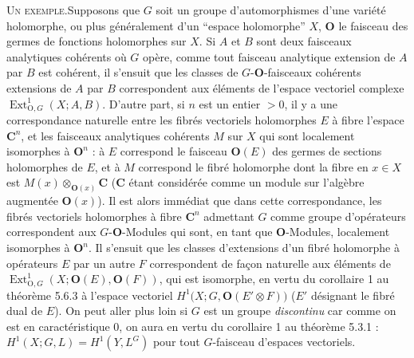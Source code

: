 \clearpage
{}

\textsc{Un exemple.}\quad Supposons que $G$ soit un groupe
d'automorphismes d'une variété holomorphe, ou plus généralement d'un
``espace holomorphe'' $X$, ${\mathbf O}$ le faisceau des germes de fonctions
holomorphes sur $X$.
Si $A$ et $B$ sont deux faisceaux analytiques cohérents où $G$ opère, comme
tout faisceau analytique extension de $A$ par $B$ est cohérent, il s'ensuit
que les classes de $G$-${\mathbf O}$-faisceaux cohérents extensions de $A$ par $B$
correspondent aux éléments de l'espace vectoriel complexe
$\operatorname{Ext}_{{\mathrm O},G}^{1}(X;A,B)$.
D'autre part, si $n$ est un entier $>0$, il y a une correspondance naturelle
entre les fibrés vectoriels holomorphes $E$ à fibre l'espace $\mathbf C^n$, et
les faisceaux analytiques cohérents $M$ sur $X$ qui sont localement isomorphes
à ${\mathbf O}^n$ : à $E$ correspond le faisceau ${\mathbf O}(E)$ des germes de sections
holomorphes de $E$, et à $M$ correspond le fibré holomorphe dont la fibre en
$x\in X$ est $M(x)\otimes_{{\mathbf O}(x)}\mathbf C$ ($\mathbf C$ étant considérée comme
un module sur l'algèbre augmentée ${\mathbf O}(x)$).
Il est alors immédiat que dans cette correspondance, les fibrés vectoriels
holomorphes à fibre $\mathbf C^n$ admettant $G$ comme groupe d'opérateurs
correspondent aux $G$-${\mathbf O}$-Modules qui sont, en tant que ${\mathbf O}$-Modules,
localement isomorphes à ${\mathbf O}^n$.
Il s'ensuit que les classes d'extensions d'un fibré holomorphe à opérateurs
$E$ par un autre $F$ correspondent de façon naturelle aux éléments de
$\operatorname{Ext}_{{\mathrm O},G}^{1}(X;{\mathbf O}(E),{\mathbf O}(F))$, qui est isomorphe, en vertu du
corollaire 1 au théorème 5.6.3 à l'espace vectoriel
$H^1\bigl(X;G,{\mathbf O}(E'\otimes F)\bigr)$
($E'$ désignant le fibré dual de $E$).
On peut aller plus loin si $G$ est un groupe \textit{discontinu} car comme on
est en caractéristique 0, on aura en vertu du corollaire 1 au théorème 5.3.1 :
$H^1(X;G,L)=H^1(Y,L^G)$ pour tout $G$-faisceau d'espaces vectoriels.
